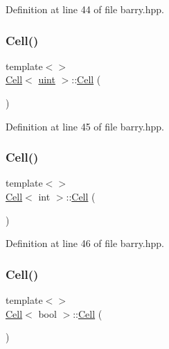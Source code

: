 Definition at line 44 of file barry.\+hpp.

\mbox{\label{class_cell_aa102374546b7479f50a8eeec80ec2764}} 
\subsubsection{\texorpdfstring{Cell()}{Cell()}\hspace{0.1cm}{\footnotesize\ttfamily [7/13]}}
{\footnotesize\ttfamily template$<$$>$ \\
\hyperlink{class_cell}{Cell}$<$ \hyperlink{typedefs_8hpp_a91ad9478d81a7aaf2593e8d9c3d06a14}{uint} $>$\+::\hyperlink{class_cell}{Cell} (\begin{DoxyParamCaption}{ }\end{DoxyParamCaption})\hspace{0.3cm}{\ttfamily [inline]}}



Definition at line 45 of file barry.\+hpp.

\mbox{\label{class_cell_a7019dc2ccc1e14bd17aa9f03b377a199}} 
\subsubsection{\texorpdfstring{Cell()}{Cell()}\hspace{0.1cm}{\footnotesize\ttfamily [8/13]}}
{\footnotesize\ttfamily template$<$$>$ \\
\hyperlink{class_cell}{Cell}$<$ int $>$\+::\hyperlink{class_cell}{Cell} (\begin{DoxyParamCaption}{ }\end{DoxyParamCaption})\hspace{0.3cm}{\ttfamily [inline]}}



Definition at line 46 of file barry.\+hpp.

\mbox{\label{class_cell_aef4b64101b33e2349ceea132b962d137}} 
\subsubsection{\texorpdfstring{Cell()}{Cell()}\hspace{0.1cm}{\footnotesize\ttfamily [9/13]}}
{\footnotesize\ttfamily template$<$$>$ \\
\hyperlink{class_cell}{Cell}$<$ bool $>$\+::\hyperlink{class_cell}{Cell} (\begin{DoxyParamCaption}{ }\end{DoxyParamCaption})\hspace{0.3cm}{\ttfamily [inline]}}



